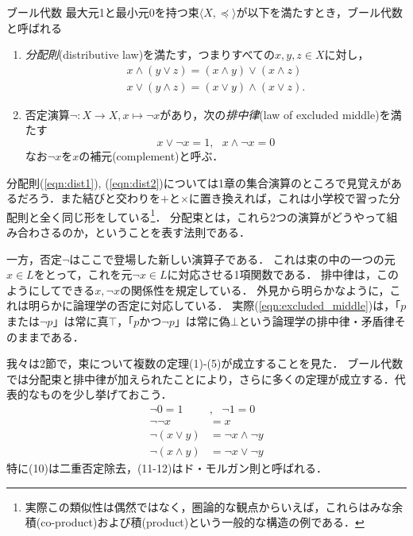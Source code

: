 \documentclass[11pt,a4paper]{jsarticle}
\begin{document}
\begin{itembox}[l]{ブール代数}
    最大元1と最小元0を持つ束$\langle X, \preceq \rangle$が以下を満たすとき，ブール代数と呼ばれる
    \begin{enumerate}
        \item \emph{分配則}(distributive law)を満たす，つまりすべての$x, y, z \in X$に対し，
        \begin{align}
         x \wedge (y \vee z) = (x \wedge y) \vee (x \wedge z) \label{eqn:dist1}\\
         x \vee (y \wedge z) = (x \vee y) \wedge (x \vee z) . \label{eqn:dist2}
        \end{align}
        \item 否定演算$\neg: X \to X, x \mapsto \neg x$があり，次の\emph{排中律}(law of excluded middle)を満たす
        \begin{equation}
            x \vee \neg x = 1, \ \ \ x \wedge \neg x = 0
           \label{eqn:excluded_middle}
        \end{equation}
        なお$\neg x$を$x$の補元(complement)と呼ぶ．
    \end{enumerate}   
\end{itembox}

分配則(\ref{eqn:dist1}), (\ref{eqn:dist2})については1章の集合演算のところで見覚えがあるだろう．また結びと交わりを$+$と$\times$に置き換えれば，これは小学校で習った分配則と全く同じ形をしている\footnote{実際この類似性は偶然ではなく，圏論的な観点からいえば，これらはみな余積(co-product)および積(product)という一般的な構造の例である．}．
分配束とは，これら2つの演算がどうやって組み合わさるのか，ということを表す法則である．

一方，否定$\neg$はここで登場した新しい演算子である．
これは束の中の一つの元$x \in L$をとって，これを元$\neg x \in L$に対応させる1項関数である．
排中律は，このようにしてできる$x, \neg x$の関係性を規定している．
外見から明らかなように，これは明らかに論理学の否定に対応している．
実際(\ref{eqn:excluded_middle})は，「$p$または$\neg p$」は常に真$\top$，「$p$かつ$\neg p$」は常に偽$\bot$という論理学の排中律・矛盾律そのままである．


我々は2節で，束について複数の定理(1)-(5)が成立することを見た．
ブール代数では分配束と排中律が加えられたことにより，さらに多くの定理が成立する．代表的なものを少し挙げておこう．
\begin{align}
\neg 0 = 1 &, \ \ \ \neg 1 = 0  \\
\neg \neg x &= x \\
\neg (x \vee y) &= \neg x \wedge \neg y \\
\neg (x \wedge y) &= \neg x \vee \neg y
\end{align}
特に(10)は二重否定除去，(11-12)はド・モルガン則と呼ばれる．
 
\end{document}

